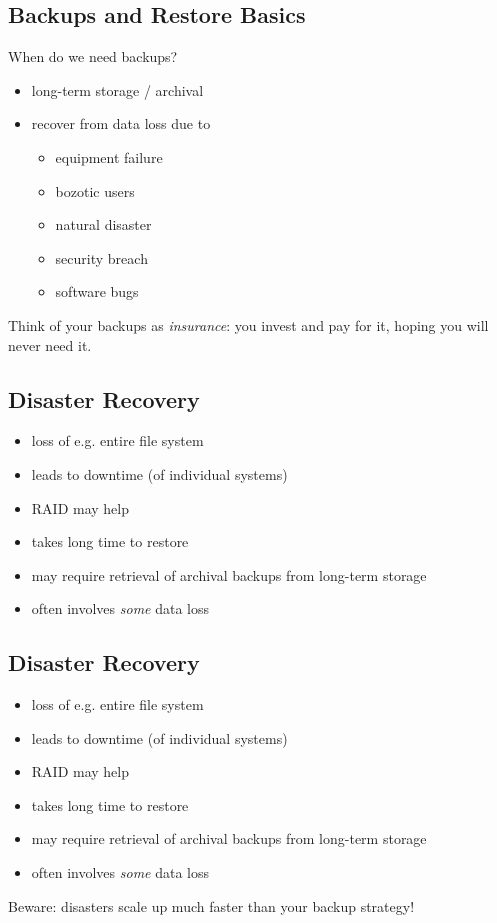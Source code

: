 \documentclass[xga]{xdvislides}
\begin{document}
\subsection{Backups and Restore Basics}
When do we need backups?
\begin{itemize}
	\item long-term storage / archival
	\item recover from data loss due to
		\begin{itemize}
			\item equipment failure
			\item bozotic users
			\item natural disaster
			\item security breach
			\item software bugs
		\end{itemize}
\end{itemize}
\addvspace{.5in}
Think of your backups as {\em insurance}:  you invest and pay for it, hoping
you will never need it.

\subsection{Disaster Recovery}
\begin{itemize}
	\item loss of e.g. entire file system
	\item leads to downtime (of individual systems)
	\item RAID may help
	\item takes long time to restore
	\item may require retrieval of archival backups from long-term storage 
	\item often involves {\em some} data loss
\end{itemize}

\subsection{Disaster Recovery}
\begin{itemize}
	\item loss of e.g. entire file system
	\item leads to downtime (of individual systems)
	\item RAID may help
	\item takes long time to restore
	\item may require retrieval of archival backups from long-term storage 
	\item often involves {\em some} data loss
\end{itemize}
\vspace{.5in}
Beware: disasters scale up much faster than your
backup strategy!
\end{document}
